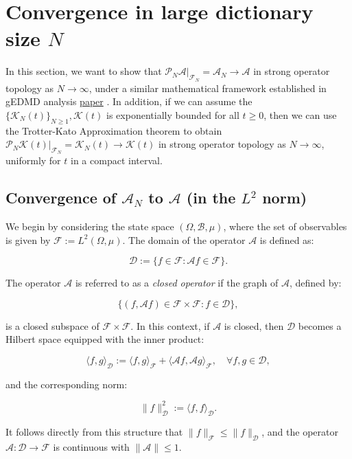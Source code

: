 \documentclass{article}[11]
\begin{document}
\section{Convergence in large dictionary size $N$}
In this section, we want to show that $\mathcal{P}_N\mathcal{A}|_{\mathcal{F}_N} = \mathcal{A}_N \to \mathcal{A}$ in strong operator topology as $N \to \infty$, under a similar mathematical framework established in gEDMD analysis \href{https://arxiv.org/abs/2405.00539}{paper} . In addition, if we can assume the $\{\mathcal{K}_{N}(t)\}_{N\geq 1}, \mathcal{K}(t)$ is exponentially bounded for all $t\geq 0$, then we can use the Trotter-Kato Approximation theorem to obtain $\mathcal{P}_N\mathcal{K}(t)|_{\mathcal{F}_N} = \mathcal{K}_{N}(t) \to \mathcal{K}(t)$ in strong operator topology as $N \to \infty$, uniformly for $t$ in a compact interval.


\subsection{Convergence of \(\mathcal{A}_N\) to \(\mathcal{A}\) (in the \(L^2\) norm)}

We begin by considering the state space \( (\Omega, \mathcal{B}, \mu) \), where the set of observables is given by \( \mathcal{F} := L^2(\Omega, \mu) \). The domain of the operator \( \mathcal{A} \) is defined as:

\[
\mathcal{D} := \{ f \in \mathcal{F} : \mathcal{A} f \in \mathcal{F} \}.
\]

The operator \( \mathcal{A} \) is referred to as a \textit{closed operator} if the graph of \( \mathcal{A} \), defined by:

\[
\{ (f, \mathcal{A} f) \in \mathcal{F} \times \mathcal{F} : f \in \mathcal{D} \},
\]

is a closed subspace of \( \mathcal{F} \times \mathcal{F} \). In this context, if \( \mathcal{A} \) is closed, then \( \mathcal{D} \) becomes a Hilbert space equipped with the inner product:

\[
\langle f, g \rangle_\mathcal{D} := \langle f, g \rangle_{\mathcal{F}} + \langle \mathcal{A} f, \mathcal{A} g \rangle_{\mathcal{F}}, \quad \forall f, g \in \mathcal{D},
\]

and the corresponding norm:

\[
\| f \|_\mathcal{D}^2 := \langle f, f \rangle_\mathcal{D}.
\]

It follows directly from this structure that \( \| f \|_{\mathcal{F}} \leq \| f \|_\mathcal{D} \), and the operator \( \mathcal{A} : \mathcal{D} \to \mathcal{F} \) is continuous with \( \| \mathcal{A} \| \leq 1 \).
\end{document}
